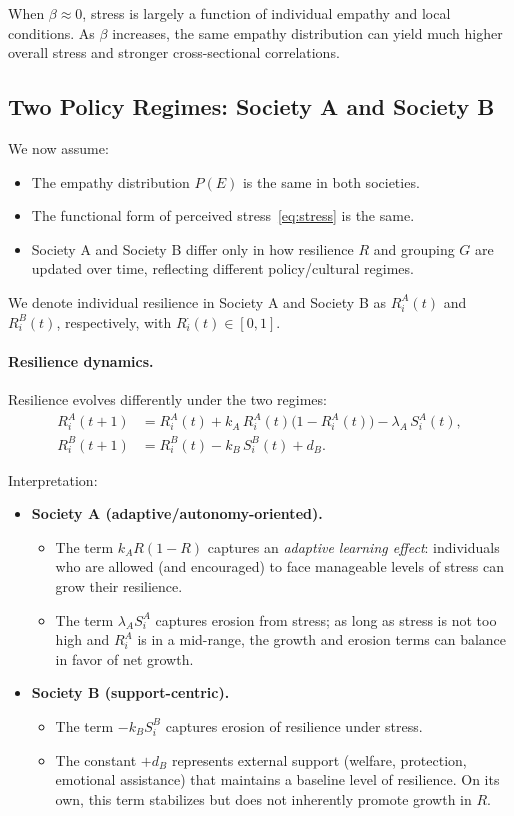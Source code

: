 \documentclass[11pt]{article}
\theoremstyle{plain}
\begin{document}
When $\beta \approx 0$, stress is largely a function of individual empathy and local conditions.
As $\beta$ increases, the same empathy distribution can yield much higher overall stress and stronger cross-sectional correlations.

\subsection{Two Policy Regimes: Society A and Society B}

We now assume:
\begin{itemize}
  \item The empathy distribution $P(E)$ is the same in both societies.
  \item The functional form of perceived stress~\eqref{eq:stress} is the same.
  \item Society A and Society B differ only in how resilience $R$ and grouping $G$ are updated over time, reflecting different policy/cultural regimes.
\end{itemize}

We denote individual resilience in Society A and Society B as $R_i^A(t)$ and $R_i^B(t)$, respectively, with $R_i^\cdot(t) \in [0,1]$.

\paragraph{Resilience dynamics.}
Resilience evolves differently under the two regimes:
\begin{align}
R_i^A(t+1) &= R_i^A(t)
+ k_A\, R_i^A(t)\bigl(1 - R_i^A(t)\bigr)
- \lambda_A\, S_i^A(t), \label{eq:RA}\\
R_i^B(t+1) &= R_i^B(t)
- k_B\, S_i^B(t)
+ d_B. \label{eq:RB}
\end{align}

Interpretation:
\begin{itemize}
  \item \textbf{Society A (adaptive/autonomy-oriented).}
  \begin{itemize}
    \item The term $k_A R(1-R)$ captures an \emph{adaptive learning effect}: individuals who are allowed (and encouraged) to face manageable levels of stress can grow their resilience.
    \item The term $\lambda_A S_i^A$ captures erosion from stress; as long as stress is not too high and $R_i^A$ is in a mid-range, the growth and erosion terms can balance in favor of net growth.
  \end{itemize}

  \item \textbf{Society B (support-centric).}
  \begin{itemize}
    \item The term $-k_B S_i^B$ captures erosion of resilience under stress.
    \item The constant $+d_B$ represents external support (welfare, protection, emotional assistance) that maintains a baseline level of resilience.
      On its own, this term stabilizes but does not inherently promote growth in $R$.
  \end{itemize}
\end{itemize}
\end{document}
